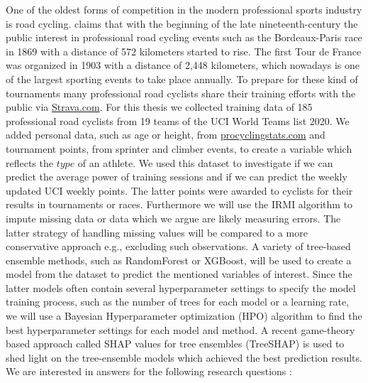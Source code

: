 \documentclass[12pt,a4paper]{article}
\begin{document}
One of the oldest forms of competition in the modern professional sports industry is road cycling. \textcite{Mignot2015} claims that with the beginning of the late nineteenth-century the public interest in professional road cycling events such as the Bordeaux-Paris race in 1869 with a distance of 572 kilometers started to rise. The first Tour de France was organized in 1903 with a distance of 2,448 kilometers, which nowadays is one of the largest sporting events to take place annually. To prepare for these kind of tournaments many professional road cyclists share their training efforts with the public via \href{Strava.com}{Strava.com}. For this thesis we collected training data of 185 professional road cyclists from 19 teams of the UCI World Teams list 2020. We added personal data, such as age or height, from \href{procyclingstats.com}{procyclingstats.com} and tournament points, from sprinter and climber events, to create a variable which reflects the \(type\) of an athlete. We used this dataset to investigate if we can predict the average power of training sessions and if we can predict the weekly updated UCI weekly points. The latter points were awarded to cyclists for their results in tournaments or races. Furthermore we will use the IRMI algorithm to impute missing data or data which we argue are likely measuring errors. The latter strategy of handling missing values will be compared to a more conservative approach e.g., excluding such observations. A variety of tree-based ensemble methods, such as RandomForest or XGBoost, will be used to create a model from the dataset to predict the mentioned variables of interest. Since the latter models often contain several hyperparameter settings to specify the model training process, such as the number of trees for each model or a learning rate, we will use a Bayesian Hyperparameter optimization (HPO) algorithm to find the best hyperparameter settings for each model and method. A recent game-theory based approach called SHAP values for tree ensembles (TreeSHAP) \textcite{Lundberg2018} is used to shed light on the tree-ensemble models which achieved the best prediction results. We are interested in answers for the following research questions :
\end{document}
